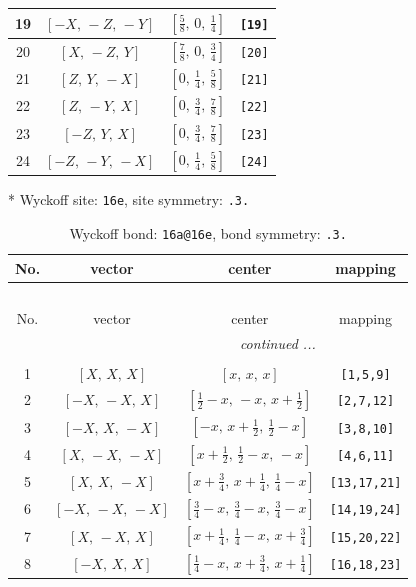 \documentclass[fleqn,8pt]{jsarticle}
\begin{document}
\begin{longtable}{cccc}
19 & $\left[ - X,\, - Z,\, - Y \right]$ & $\left[ \frac{5}{8},\, 0,\, \frac{1}{4} \right]$ & {\tt [19]} \\ \hline
20 & $\left[ X,\, - Z,\, Y \right]$ & $\left[ \frac{7}{8},\, 0,\, \frac{3}{4} \right]$ & {\tt [20]} \\ \hline
21 & $\left[ Z,\, Y,\, - X \right]$ & $\left[ 0,\, \frac{1}{4},\, \frac{5}{8} \right]$ & {\tt [21]} \\ \hline
22 & $\left[ Z,\, - Y,\, X \right]$ & $\left[ 0,\, \frac{3}{4},\, \frac{7}{8} \right]$ & {\tt [22]} \\ \hline
23 & $\left[ - Z,\, Y,\, X \right]$ & $\left[ 0,\, \frac{3}{4},\, \frac{7}{8} \right]$ & {\tt [23]} \\ \hline
24 & $\left[ - Z,\, - Y,\, - X \right]$ & $\left[ 0,\, \frac{1}{4},\, \frac{5}{8} \right]$ & {\tt [24]} \\
\end{longtable}
* Wyckoff site: {\tt 16e}, site symmetry: {\tt .3.}
\renewcommand{\arraystretch}{1.2}
\begin{longtable}{cccc}
\caption{Wyckoff bond: {\tt 16a@16e}, bond symmetry: {\tt .3.}}
 \\
 \hline \hline
No. & vector & center & mapping \\ \hline \endfirsthead

\multicolumn{3}{l}{\tablename\ \thetable{}} \\
 \hline \hline
No. & vector & center & mapping \\ \hline \endhead

 \hline \hline
\multicolumn{3}{r}{\footnotesize\it continued ...} \\ \endfoot

 \hline \hline
\multicolumn{3}{r}{} \\ \endlastfoot

1 & $\left[ X,\, X,\, X \right]$ & $\left[ x,\, x,\, x \right]$ & {\tt [1,5,9]} \\ \hline
2 & $\left[ - X,\, - X,\, X \right]$ & $\left[ \frac{1}{2} - x,\, - x,\, x + \frac{1}{2} \right]$ & {\tt [2,7,12]} \\ \hline
3 & $\left[ - X,\, X,\, - X \right]$ & $\left[ - x,\, x + \frac{1}{2},\, \frac{1}{2} - x \right]$ & {\tt [3,8,10]} \\ \hline
4 & $\left[ X,\, - X,\, - X \right]$ & $\left[ x + \frac{1}{2},\, \frac{1}{2} - x,\, - x \right]$ & {\tt [4,6,11]} \\ \hline
5 & $\left[ X,\, X,\, - X \right]$ & $\left[ x + \frac{3}{4},\, x + \frac{1}{4},\, \frac{1}{4} - x \right]$ & {\tt [13,17,21]} \\ \hline
6 & $\left[ - X,\, - X,\, - X \right]$ & $\left[ \frac{3}{4} - x,\, \frac{3}{4} - x,\, \frac{3}{4} - x \right]$ & {\tt [14,19,24]} \\ \hline
7 & $\left[ X,\, - X,\, X \right]$ & $\left[ x + \frac{1}{4},\, \frac{1}{4} - x,\, x + \frac{3}{4} \right]$ & {\tt [15,20,22]} \\ \hline
8 & $\left[ - X,\, X,\, X \right]$ & $\left[ \frac{1}{4} - x,\, x + \frac{3}{4},\, x + \frac{1}{4} \right]$ & {\tt [16,18,23]} \\
\end{longtable}
\end{document}
